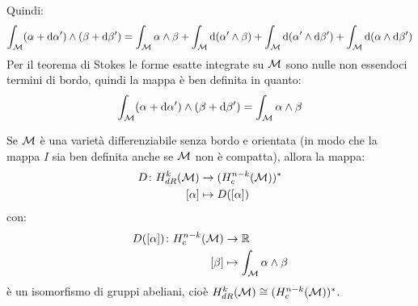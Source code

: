 Quindi:
\[
  \int_{\mathcal{M}} (\alpha + \operatorname{d}\!{\alpha}') \wedge (\beta + \operatorname{d}\!{\beta}') = \int_{\mathcal{M}} \alpha \wedge \beta + \int_{\mathcal{M}} \operatorname{d}\!{(\alpha' \wedge \beta)} + \int_{\mathcal{M}} \operatorname{d}\!{(\alpha' \wedge \operatorname{d}\!{\beta}')} + \int_{\mathcal{M}} \operatorname{d}\!{(\alpha \wedge \operatorname{d}\!{\beta}')}
\]
Per il teorema di Stokes le forme esatte integrate su $ \mathcal{M} $ sono nulle non essendoci termini di bordo,
quindi la mappa è ben definita in quanto:
\[
  \int_{\mathcal{M}} (\alpha + \operatorname{d}\!{\alpha}') \wedge (\beta + \operatorname{d}\!{\beta}') = \int_{\mathcal{M}} \alpha \wedge \beta
\]
\begin{theorem}
  Se $ \mathcal{M} $ è una varietà differenziabile senza bordo e orientata (in modo che
  la mappa $ I $ sia ben definita anche se $ \mathcal{M} $ non è compatta), allora la
  mappa:
  \begin{align*}
    D \colon H^k_{dR}(\mathcal{M}) & \to (H_c^{n-k}(\mathcal{M}))^* \\
    [\alpha] & \mapsto D([\alpha])
  \end{align*}
  con:
  \begin{align*}
    D([\alpha]) \colon H^{n-k}_c(\mathcal{M}) & \to \mathbb{R}^{} \\
    [\beta] & \mapsto \int_{\mathcal{M}} \alpha \wedge \beta
  \end{align*}
  è un isomorfismo di gruppi abeliani, cioè $ H^k_{dR}(\mathcal{M}) \cong (H^{n-k}_c(\mathcal{M}))^* $.
\end{theorem}
